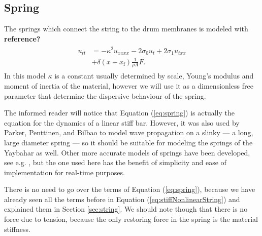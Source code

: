 \documentclass{article}
\begin{document}
\subsection{Spring}
\label{sec:spring}

The springs which connect the string to the drum membranes is modeled with \textbf{reference?}
\begin{align}
  \begin{split}
  u_{tt} &= -\kappa^2 u_{xxxx}- 2 \sigma_0 u_t + 2 \sigma_1 u_{txx} \\
  & + \delta(x-x_\text{f})\frac{1}{\rho A} F.
  \end{split}
  \label{eq:spring}
\end{align}
In this model $\kappa$ is a constant usually determined by scale, Young's modulus and moment of inertia of the material, however we will use it as a dimensionless free parameter that determine the dispersive behaviour of the spring\cite{bilbao_modular_2009}\cite{parker_modeling_2010}.

The informed reader will notice that Equation (\ref{eq:spring}) is actually the equation for the dynamics of a linear stiff bar\cite{bilbao_modular_2009}\cite[Chapter~7]{bilbao_numerical_2009}.
However, it was also used by Parker, Penttinen, and Bilbao to model wave propagation on a slinky --- a long, large diameter spring --- so it should be suitable for modeling the springs of the Yaybahar as well\cite{parker_modeling_2010}.
Other more accurate models of springs have been developed, see e.g. \cite{parker_spring_2009}, but the one used here has the benefit of simplicity and ease of implementation for real-time purposes.

There is no need to go over the terms of Equation (\ref{eq:spring}), because we have already seen all the terms before in Equation (\ref{eq:stiffNonlinearString}) and explained them in Section \ref{sec:string}.
We should note though that there is no force due to tension, because the only restoring force in the spring is the material stiffness.
\end{document}
